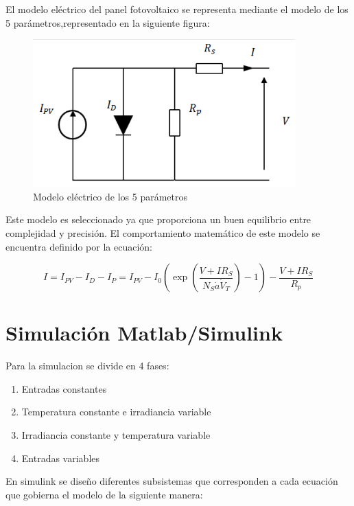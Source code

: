 \documentclass[a4paper,12pt]{article}
\begin{document}
	El modelo eléctrico del panel fotovoltaico se representa mediante el modelo de los 5 parámetros,representado en la siguiente figura:
	
	
	
	\begin{figure}[htb]
		\centering
		\includegraphics[width=0.9\textwidth]{./imagenes/circuito.png}
		\caption{Modelo eléctrico de los 5 parámetros}
	\end{figure}
	
	Este modelo es seleccionado ya que proporciona un buen equilibrio entre complejidad y precisión. El comportamiento matemático de este modelo se encuentra definido por la
	ecuación:
	
	\begin{equation*}
		I = I_{PV} - I_D - I_P = I_{PV} - I_0 \left ( \exp\left (  \frac{V+IR_S}{N_S \dot a \dot V_T}\right ) - 1 \right ) - \frac{V+IR_S}{R_p}
	\end{equation*}

	\section{Simulación Matlab/Simulink}
	
	Para la simulacion se divide en 4 fases:
	
	\begin{enumerate}
		\item Entradas constantes
		\item Temperatura constante e irradiancia variable
		\item Irradiancia constante y temperatura variable
		\item Entradas variables
	\end{enumerate}

	\newpage
	
	En simulink se diseño diferentes subsistemas que corresponden a cada ecuación que gobierna el modelo de la siguiente manera:
	
\end{document}
